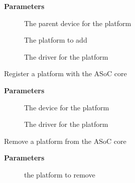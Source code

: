 \documentclass[a4paper,8pt,english]{sphinxmanual}
\begin{document}
\textbf{Parameters}
\begin{description}
\item[{}] \leavevmode
The parent device for the platform

\item[{}] \leavevmode
The platform to add

\item[{}] \leavevmode
The driver for the platform

\end{description}

\begin{fulllineitems}
\label{sound/kernel-api/alsa-driver-api:c.snd_soc_register_platform}
Register a platform with the ASoC core

\end{fulllineitems}


\textbf{Parameters}
\begin{description}
\item[{}] \leavevmode
The device for the platform

\item[{}] \leavevmode
The driver for the platform

\end{description}

\begin{fulllineitems}
\label{sound/kernel-api/alsa-driver-api:c.snd_soc_remove_platform}
Remove a platform from the ASoC core

\end{fulllineitems}


\textbf{Parameters}
\begin{description}
\item[{}] \leavevmode
the platform to remove

\end{description}
\end{document}
